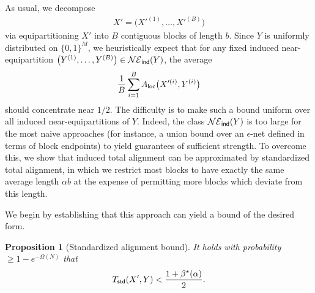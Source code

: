 \documentclass[11pt]{amsart}
\numberwithin{equation}{section}
\numberwithin{equation}{section}
\newcommand{\1}{\mathbbm{1}}
\newcommand{\ind}{\textup{\textsf{ind}}}
\newcommand{\std}{\textup{\textsf{std}}}
\newcommand{\loc}{\textup{\textsf{loc}}}
\newtheorem{proposition}[theorem]{Proposition}
\theoremstyle{definition}
\begin{document}
As usual, we decompose
\begin{align*}
    X' = \big( X'^{(1)}, \dots, X'^{(B)} \big)
\end{align*}
via equipartitioning $X'$ into $B$ contiguous blocks of length $b$. Since $Y$ is uniformly distributed on $\{0,1\}^M$, we heuristically expect that for any fixed induced near-equipartition $\big(Y^{(1)},\dots,Y^{(B)}\big)\in\mathcal{NE}_\ind(Y)$, the average
\begin{align*}
    \frac{1}{B}\sum_{i=1}^B A_{\loc}\big(X'^{(i)},Y^{(i)}\big)
\end{align*}
should concentrate near $1/2$. The difficulty is to make such a bound uniform over all induced near-equipartitions of $Y$. Indeed, the class $\mathcal{NE}_{\ind}(Y)$ is too large for the most naive approaches (for instance, a union bound over an $\epsilon$-net defined in terms of block endpoints) to yield guarantees of sufficient strength. To overcome this, we show that induced total alignment can be approximated by standardized total alignment, in which we restrict most blocks to have exactly the same average length $\alpha b$ at the expense of permitting more blocks which deviate from this length. 

We begin by establishing that this approach can yield a bound of the desired form.

\begin{proposition}[Standardized alignment bound] \label{prop:total_alignment_2_bd}
    It holds with probability $\geq 1-e^{-\Omega(N)}$ that
    \begin{align*}
        T_\std\!\left( X', Y \right) < \frac{1+\beta^\star(\alpha)}{2}.
    \end{align*}
\end{proposition}
\end{document}
